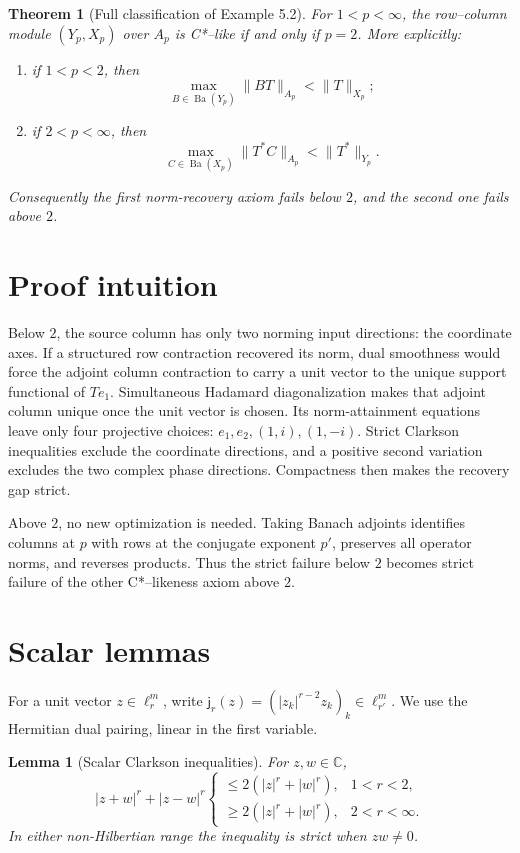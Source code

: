 \documentclass[11pt]{article}
\newtheorem{theorem}{Theorem}
\newtheorem{lemma}{Lemma}
\newcommand{\C}{\mathbb C}
\newcommand{\Ba}{\operatorname{Ba}}
\newcommand{\jj}{\mathsf j}
\begin{document}
\begin{theorem}[Full classification of Example 5.2]\label{thm:main}
For \(1<p<\infty\), the row--column module \((Y_p,X_p)\) over \(A_p\) is
C*--like if and only if \(p=2\).  More explicitly:
\begin{enumerate}
\item if \(1<p<2\), then
\[
 \max_{B\in\Ba(Y_p)}\|BT\|_{A_p}<\|T\|_{X_p};
\]
\item if \(2<p<\infty\), then
\[
 \max_{C\in\Ba(X_p)}\|T^*C\|_{A_p}<\|T^*\|_{Y_p}.
\]
\end{enumerate}
Consequently the first norm-recovery axiom fails below \(2\), and the second
one fails above \(2\).
\end{theorem}

\section{Proof intuition}

Below \(2\), the source column has only two norming input directions: the
coordinate axes.  If a structured row contraction recovered its norm, dual
smoothness would force the adjoint column contraction to carry a unit vector
to the unique support functional of \(Te_1\).  Simultaneous Hadamard
diagonalization makes that adjoint column unique once the unit vector is
chosen.  Its norm-attainment equations leave only four projective choices:
\(e_1,e_2,(1,i),(1,-i)\).  Strict Clarkson inequalities exclude the coordinate
directions, and a positive second variation excludes the two complex phase
directions.  Compactness then makes the recovery gap strict.

Above \(2\), no new optimization is needed.  Taking Banach adjoints identifies
columns at \(p\) with rows at the conjugate exponent \(p'\), preserves all
operator norms, and reverses products.  Thus the strict failure below \(2\)
becomes strict failure of the other C*--likeness axiom above \(2\).

\section{Scalar lemmas}

For a unit vector \(z\in\ell_r^m\), write
\(\jj_r(z)=(|z_k|^{r-2}z_k)_k\in\ell_{r'}^m\).  We use the Hermitian dual
pairing, linear in the first variable.

\begin{lemma}[Scalar Clarkson inequalities]\label{lem:clarkson}
For \(z,w\in\C\),
\[
 |z+w|^r+|z-w|^r
 \begin{cases}
 \le 2(|z|^r+|w|^r),&1<r<2,\\
 \ge 2(|z|^r+|w|^r),&2<r<\infty.
 \end{cases}
\]
In either non-Hilbertian range the inequality is strict when \(zw\ne0\).
\end{lemma}
\end{document}
